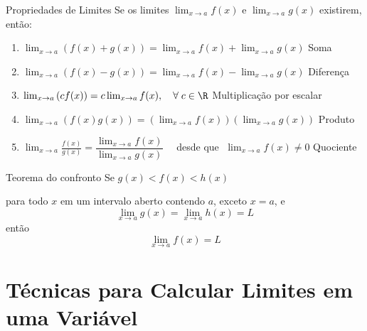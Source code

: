 \documentclass[fleqn,utf8,aspectratio=169,12pt]{beamer}
\begin{document}
\begin{frame}{Propriedades de Limites}
  Se os limites \(\lim_{x\to a}f(x)\) e  \(\lim_{x\to a}g(x)\) existirem, então:\\[4mm]
  \pause
  \begin{enumerate}[<+->]
    \item
      \(
        \lim_{x\to a} \left(f(x)+g(x)\right)
        = \lim_{x\to a}f(x) + \lim_{x\to a}g(x)
      \)
      \hfill Soma
      \\[5mm]

    \item
      \(
        \lim_{x\to a} \left(f(x)-g(x)\right)
        = \lim_{x\to a}f(x) - \lim_{x\to a}g(x)
      \)
      \hfill Diferença
      \\[5mm]

    \item
      \(
        \lim_{x\to a} \left(c f(x)\right)
        = c\lim_{x\to a} f(x),\quad \forall\; c\in\R
      \)
      \hfill Multiplicação por escalar
      \\[5mm]

    \item
      \(
        \lim_{x\to a} \left(f(x)g(x)\right)
        = \left(\lim_{x\to a} f(x)\right)\left(\lim_{x\to a} g(x)\right)
      \)
      \hfill Produto
      \\[5mm]

    \item
      \(
        \lim_{x\to a} \frac{f(x)}{g(x)}
        = \dfrac{\displaystyle \lim_{x\to a} f(x)}{\displaystyle \lim_{x\to a} g(x)}\quad
      \)
      desde que $\;\lim_{x\to a} f(x) \neq 0$
      \hfill Quociente
  \end{enumerate}
\end{frame}

\begin{frame}{Teorema do confronto}
  Se \(g(x) < f(x) < h(x)\)

  \pause
  para todo $x$ em um intervalo aberto contendo $a$,
  \pause
  exceto $x = a$,
  \pause
  e
  \[
    \lim_{x\to a} g(x) = \lim_{x\to a} h(x) = L
  \]
  \pause
  então
  \[
   \lim_{x\to a} f(x) = L
  \]
\end{frame}

\section{Técnicas para Calcular Limites em uma Variável}
\end{document}
